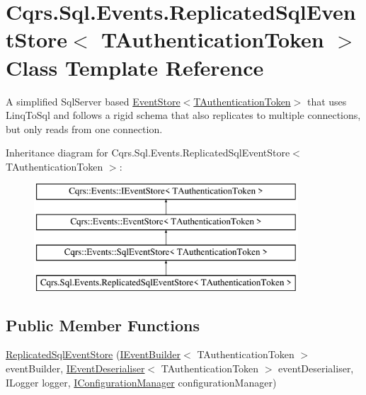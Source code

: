 \hypertarget{classCqrs_1_1Sql_1_1Events_1_1ReplicatedSqlEventStore}{}\section{Cqrs.\+Sql.\+Events.\+Replicated\+Sql\+Event\+Store$<$ T\+Authentication\+Token $>$ Class Template Reference}
\label{classCqrs_1_1Sql_1_1Events_1_1ReplicatedSqlEventStore}


A simplified Sql\+Server based \hyperlink{classCqrs_1_1Events_1_1EventStore_a6346cb2aea4c5b4e740dc6cfb15abab8_a6346cb2aea4c5b4e740dc6cfb15abab8}{Event\+Store$<$\+T\+Authentication\+Token$>$} that uses Linq\+To\+Sql and follows a rigid schema that also replicates to multiple connections, but only reads from one connection.  


Inheritance diagram for Cqrs.\+Sql.\+Events.\+Replicated\+Sql\+Event\+Store$<$ T\+Authentication\+Token $>$\+:\begin{figure}[H]
\begin{center}
\leavevmode
\includegraphics[height=4.000000cm]{classCqrs_1_1Sql_1_1Events_1_1ReplicatedSqlEventStore}
\end{center}
\end{figure}
\subsection*{Public Member Functions}
\begin{DoxyCompactItemize}
\item 
\hyperlink{classCqrs_1_1Sql_1_1Events_1_1ReplicatedSqlEventStore_aa00d17e2b147ebf7d2aff5ef1a543c07_aa00d17e2b147ebf7d2aff5ef1a543c07}{Replicated\+Sql\+Event\+Store} (\hyperlink{interfaceCqrs_1_1Events_1_1IEventBuilder}{I\+Event\+Builder}$<$ T\+Authentication\+Token $>$ event\+Builder, \hyperlink{interfaceCqrs_1_1Events_1_1IEventDeserialiser}{I\+Event\+Deserialiser}$<$ T\+Authentication\+Token $>$ event\+Deserialiser, I\+Logger logger, \hyperlink{interfaceCqrs_1_1Configuration_1_1IConfigurationManager}{I\+Configuration\+Manager} configuration\+Manager)
\end{DoxyCompactItemize}
